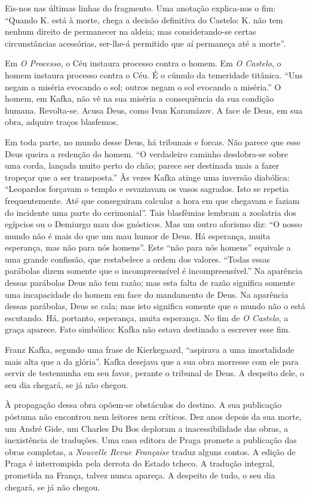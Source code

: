 Eis-nos nas últimas linhas do fragmento. Uma anotação explica-nos o fim:
``Quando K. está à morte, chega a decisão definitiva do Castelo: K. não
tem nenhum direito de permanecer na aldeia; mas considerando-se certas
circunstâncias acessórias, ser-lhe-á permitido que aí permaneça até a
morte''.

Em \textit{O Processo}, o Céu instaura processo contra o homem. Em \textit{O Castelo}, o homem instaura processo contra o Céu. É o cúmulo da
temeridade titânica. ``Uns negam a miséria evocando o sol; outros negam
o sol evocando a miséria.'' O homem, em Kafka, não vê na sua miséria a
consequência da sua condição humana. Revolta-se. Acusa Deus, como Ivan Karamázov. A face de Deus, em sua obra, adquire traços blasfemos.

Em toda parte, no mundo desse Deus, há tribunais e forcas. Não parece que
esse Deus queira a redenção do homem. ``O verdadeiro caminho desdobra-se
sobre uma corda, lançada muito perto do chão; parece ser destinada
mais a fazer tropeçar que a ser transposta.'' Às vezes Kafka atinge uma
inversão diabólica: ``Leopardos forçavam o templo e esvaziavam os vasos
sagrados. Isto se repetia frequentemente. Até que conseguiram calcular a
hora em que chegavam e faziam do incidente uma parte do cerimonial''.
Tais blasfêmias lembram a zoolatria dos egípcios ou o Demiurgo mau dos
gnósticos. Mas um outro aforismo diz: ``O nosso mundo não é mais do que
um mau humor de Deus. Há esperança, muita esperança, mas não para nós
homens''. Este ``não para nós homens'' equivale a uma grande confissão,
que restabelece a ordem dos valores. ``Todas essas parábolas dizem somente que o incompreensível é incompreensível.'' Na aparência dessas
parábolas Deus não tem razão; mas esta falta de razão significa somente
uma incapacidade do homem em face do mandamento de Deus. Na aparência
dessas parábolas, Deus se cala; mas isto significa somente que o mundo
não o está escutando. Há, portanto, esperança, muita esperança. No fim
de \textit{O Castelo}, a graça aparece. Fato simbólico: Kafka não estava
destinado a escrever esse fim.

Franz Kafka, segundo uma frase de
Kierkegaard, ``aspirava a uma imortalidade mais alta que a da glória''.
Kafka desejava que a sua obra morresse com ele para servir de testemunha
em seu favor, perante o tribunal de Deus. A despeito dele, o seu dia chegará, se já não chegou.

À propagação dessa obra opõem-se obstáculos do destino. A sua publicação póstuma não encontrou nem leitores nem críticos. Dez anos depois da sua morte,
um André Gide, um Charles Du Bos deploram a inacessibilidade das obras,
a inexistência de traduções. Uma casa editora de Praga promete a publicação das obras completas, a \textit{Nouvelle Revue Française} traduz alguns contos. A
edição de Praga é interrompida pela derrota do Estado tcheco. A tradução
integral, prometida na França, talvez nunca apareça. A despeito de tudo,
o seu dia chegará, se já não chegou.

